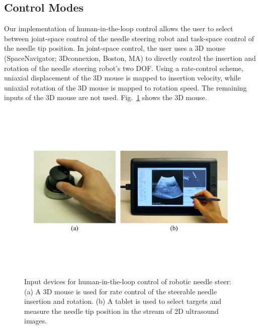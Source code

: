 \subsection{Control Modes}
Our implementation of human-in-the-loop control allows the user to select between joint-space control of the needle steering robot and task-space control of the needle tip position. In joint-space control, the user uses a 3D mouse (SpaceNavigator; 3Dconnexion, Boston, MA) to directly control the insertion and rotation of the needle steering robot's two DOF. Using a rate-control scheme, uniaxial displacement of the 3D mouse is mapped to insertion velocity, while uniaxial rotation of the 3D mouse is mapped to rotation speed. The remaining inputs of the 3D mouse are not used. Fig.~\ref{fig:InputDevices} shows the 3D mouse.

\begin{figure}[!t]
\centering
\includegraphics[width = \columnwidth]{./Images/Chapter5/InputDevices/InputDevices.pdf}%
\caption[Input devices for robot control]{Input devices for human-in-the-loop control of robotic needle steer: (a) A 3D mouse is used for rate control of the steerable needle insertion and rotation. (b) A tablet is used to select targets and measure the needle tip position in the stream of 2D ultrasound images.}
\label{fig:InputDevices}
\end{figure}  

